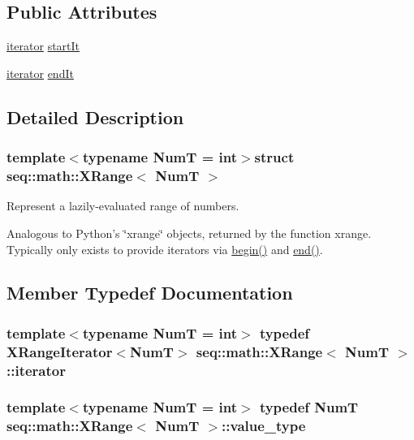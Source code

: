 \subsection*{Public Attributes}
\begin{DoxyCompactItemize}
\item 
\hyperlink{structseq_1_1math_1_1_x_range_abafa12c8fe329c911982d7437e7b0281}{iterator} \hyperlink{structseq_1_1math_1_1_x_range_ab79c83388a6443fe62ad2a4162af999d}{start\-It}
\item 
\hyperlink{structseq_1_1math_1_1_x_range_abafa12c8fe329c911982d7437e7b0281}{iterator} \hyperlink{structseq_1_1math_1_1_x_range_ad0c15c89614e21576d3f6175d9ca1009}{end\-It}
\end{DoxyCompactItemize}


\subsection{Detailed Description}
\subsubsection*{template$<$typename Num\-T = int$>$struct seq\-::math\-::\-X\-Range$<$ Num\-T $>$}

Represent a lazily-\/evaluated range of numbers. 

Analogous to Python's \char`\"{}xrange\char`\"{} objects, returned by the function {\ttfamily xrange}. Typically only exists to provide iterators via {\ttfamily \hyperlink{structseq_1_1math_1_1_x_range_a231541cb2a2f68811f3bb96ea14689bf}{begin()}} and {\ttfamily \hyperlink{structseq_1_1math_1_1_x_range_afe800d3e48413221a54ff54bfcf14206}{end()}}. 

\subsection{Member Typedef Documentation}
\hypertarget{structseq_1_1math_1_1_x_range_abafa12c8fe329c911982d7437e7b0281}{
\subsubsection[{iterator}]{\setlength{\rightskip}{0pt plus 5cm}template$<$typename Num\-T = int$>$ typedef {\bf X\-Range\-Iterator}$<$Num\-T$>$ {\bf seq\-::math\-::\-X\-Range}$<$ Num\-T $>$\-::{\bf iterator}}}\label{structseq_1_1math_1_1_x_range_abafa12c8fe329c911982d7437e7b0281}
\hypertarget{structseq_1_1math_1_1_x_range_adfd6ff29384303c71cf33c903e099e3c}{
\subsubsection[{value\-\_\-type}]{\setlength{\rightskip}{0pt plus 5cm}template$<$typename Num\-T = int$>$ typedef Num\-T {\bf seq\-::math\-::\-X\-Range}$<$ Num\-T $>$\-::{\bf value\-\_\-type}}}\label{structseq_1_1math_1_1_x_range_adfd6ff29384303c71cf33c903e099e3c}


